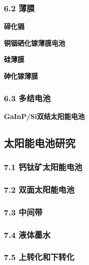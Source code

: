 \subsubsection{6.2 薄膜}



\textbf{碲化镉}



\textbf{铜铟硒化镓薄膜电池}



\textbf{硅薄膜}



\textbf{砷化镓薄膜}



\subsubsection{6.3 多结电池}



\textbf{GaInP/Si双结太阳能电池}



\subsection{太阳能电池研究}

\subsubsection{7.1 钙钛矿太阳能电池}



\subsubsection{7.2 双面太阳能电池}



\subsubsection{7.3 中间带}



\subsubsection{7.4 液体墨水}



\subsubsection{7.5 上转化和下转化}




